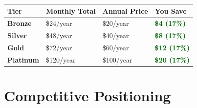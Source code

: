 \documentclass[11pt,a4paper]{article}
\begin{document}
\begin{center}
\renewcommand{\arraystretch}{1.6}
\begin{tabular}{>{\centering\arraybackslash}p{3cm} >{\centering\arraybackslash}p{3cm} >{\centering\arraybackslash}p{3cm} >{\centering\arraybackslash}p{3cm}}
\toprule
\rowcolor{miloprimary!15}
\textbf{Tier} & \textbf{Monthly Total} & \textbf{Annual Price} & \textbf{You Save} \\
\midrule
\rowcolor{bronzecolor!8}
\textcolor{bronzecolor}{\textbf{Bronze}} & \$24/year & \$20/year & \textcolor{darkgreen}{\textbf{\$4 (17\%)}} \\
\rowcolor{silvercolor!8}
\textcolor{silvercolor}{\textbf{Silver}} & \$48/year & \$40/year & \textcolor{darkgreen}{\textbf{\$8 (17\%)}} \\
\rowcolor{goldcolor!8}
\textcolor{goldcolor}{\textbf{Gold}} & \$72/year & \$60/year & \textcolor{darkgreen}{\textbf{\$12 (17\%)}} \\
\rowcolor{platinumcolor!8}
\textcolor{platinumcolor}{\textbf{Platinum}} & \$120/year & \$100/year & \textcolor{darkgreen}{\textbf{\$20 (17\%)}} \\
\bottomrule
\end{tabular}
\end{center}

\vspace{0.6cm}

\begin{center}
\end{center}

\newpage

\section*{\textcolor{miloprimary}{Competitive Positioning}}
\end{document}
